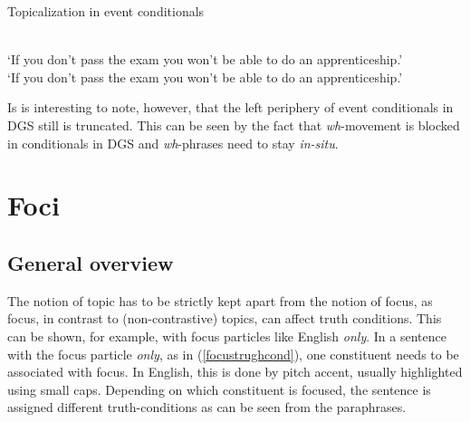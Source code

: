 \begin{digression}{Topicalization in event conditionals}{}
\begin{exe}
\ex\begin{xlist}  \label{bavarianextractiondgs}
\ex {}  \\
`If you don't pass the exam you won't be able to do an apprenticeship.' \label{bavarianextractiondgsa}
\ex {}   \\
`If you don't pass the exam you won't be able to do an apprenticeship.' \label{bavarianextractiondgsb}
\end{xlist}
\end{exe}

\noindent Is is interesting to note, however, that the left periphery of event conditionals in DGS still is truncated. This can be seen by the fact that \textit{wh}-movement is blocked in conditionals in DGS and \textit{wh}-phrases need to stay \textit{in-situ}.




%

\end{digression}


\section{Foci}\label{generalfocussection}
\subsection{General overview}
\label{finersplitsfocus}
The notion of topic has to be strictly kept apart from the notion of focus, as focus, in contrast to (non-contrastive) topics, can affect truth conditions. This can be shown, for example, with focus particles like English \textit{only}. In a sentence with the focus particle \textit{only}, as in (\ref{focustrughcond}), one constituent needs to be associated with focus. In English, this is done by pitch accent, usually highlighted using small caps. Depending on which constituent is focused, the sentence is assigned different truth-conditions as can be seen from the paraphrases. %



